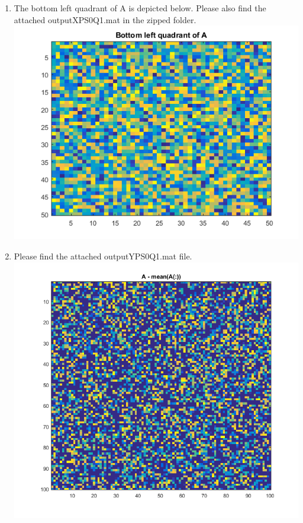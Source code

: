 \documentclass[man]{apa6}
\begin{document}
\begin{enumerate}
\begin{enumerate}
				\item The bottom left quadrant of A is depicted below. Please also find the attached outputXPS0Q1.mat in the zipped folder.
					\includegraphics[width=\linewidth]{plots/1-A-4/c.png}
					
				\item Please find the attached outputYPS0Q1.mat file.
					\includegraphics[width=\linewidth]{plots/1-A-4/d.png}
					

\end{enumerate}
\end{enumerate}
\end{document}
